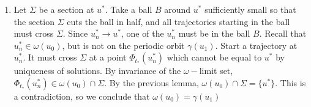 \documentclass{article}
\begin{document}
\begin{enumerate}
\item Let $\Sigma$ be a section at $u^*$. Take a ball $B$ around $u^*$ sufficiently small so that the section $\Sigma$ cuts the ball in half, and all trajectories starting in the ball must cross $\Sigma$. Since $u_n^* \rightarrow u^*$, one of the $u_n^*$ must be in the ball $B$. Recall that $u_n^* \in \omega(u_0)$, but is not on the periodic orbit $\gamma(u_1)$. Start a trajectory at $u_n^*$. It must cross $\Sigma$ at a point $\Phi_{t_*}(u_n^*)$ which cannot be equal to $u^*$ by uniqueness of solutions. By invariance of the $\omega-$limit set, $\Phi_{t_*}(u_n^*) \in \omega(u_0) \cap \Sigma$. By the previous lemma, $\omega(u_0) \cap \Sigma = \{ u^* \}$. This is a contradiction, so we conclude that $\omega(u_0) = \gamma(u_1)$

\end{enumerate}
\end{document}
